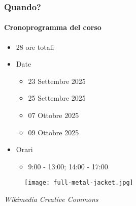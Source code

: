 \begin{frame}[t,fragile] \frametitle{Quando?}
\framesubtitle{Cronoprogramma del corso}
    \begin{itemize}[leftmargin=10pt,align=right]
        \item[\alert{\faArrowCircleRight}] 28 ore totali
        \item[\alert{\faArrowCircleRight}] Date
        \begin{itemize}[leftmargin=10pt,align=right]
            \item[\alert{\faArrowCircleRight}] 23 Settembre 2025
            \item[\alert{\faArrowCircleRight}] 25 Settembre 2025
            \item[\alert{\faArrowCircleRight}] 07 Ottobre 2025
            \item[\alert{\faArrowCircleRight}] 09 Ottobre 2025
        \end{itemize}
        \item[\alert{\faArrowCircleRight}] Orari
        \begin{itemize}[leftmargin=10pt,align=right]
            \item[\alert{\faArrowCircleRight}] 9:00 - 13:00; 14:00 - 17:00
        \end{itemize}
    \end{itemize}
    \begin{center}
        \begin{minipage}[b]{.45\textwidth}
		    \begin{figure}[ht]
			    \texttt{[image: full-metal-jacket.jpg]}
		    \end{figure}
            \begin{flushright}
                \vspace*{-10pt}
                {\tiny\textit{\textcopyright Wikimedia Creative Commons}}
            \end{flushright}
	    \end{minipage}
    \end{center}
\end{frame}
%
